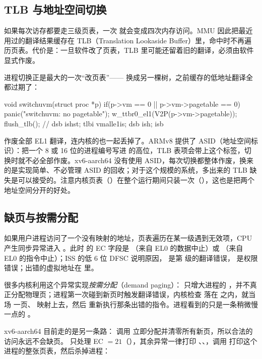 \subsection{TLB 与地址空间切换}

如果每次访存都要走三级页表，一次  就会变成四次内存访问。MMU 因此把最近用过的翻译结果缓存在 TLB（Translation Lookaside Buffer）里，命中时不再遍历页表。代价是：一旦软件改了页表，TLB 里可能还留着旧的翻译，必须由软件显式作废。

进程切换正是最大的一次“改页表”—— 换成另一棵树，之前缓存的低地址翻译全都过期了：

\begin{ccode}
void switchuvm(struct proc *p) {
  if(p->vm == 0 || p->vm->pagetable == 0) panic("switchuvm: no pagetable");
  w_ttbr0_el1(V2P(p->vm->pagetable));
  flush_tlb();                 // dsb ishst; tlbi vmalle1is; dsb ish; isb
}
\end{ccode}

 作废全部 EL1 翻译，连内核的也一起丢掉了。ARMv8 提供了 ASID（地址空间标识）：把一个 8 或 16 位的进程编号写进  的高位，TLB 表项会带上这个标签，切换时就不必全部作废。xv6-aarch64 没有使用 ASID，每次切换都整体作废，换来的是实现简单、不必管理 ASID 的回收；对于这个规模的系统，多出来的 TLB 缺失是可以接受的。注意内核页表（）在整个运行期间只装一次（），这也是把两个地址空间分开的好处。

\subsection{缺页与按需分配}

如果用户进程访问了一个没有映射的地址，页表遍历在某一级遇到无效项，CPU 产生同步异常进入 。此时  的 EC 字段是 （来自 EL0 的数据中止）或 （来自 EL0 的指令中止）；ISS 的低 6 位 DFSC 说明原因， 是第  级的翻译错误， 是权限错误；出错的虚拟地址在  里。

很多内核利用这个异常实现\emph{按需分配}（demand paging）： 只增大进程的 ，并不真正分配物理页；进程第一次碰到新页时触发翻译错误，内核检查  落在 \code{[0, sz)} 之内，就当场  一页、 映射上去，然后  重新执行那条出错的指令。进程看到的只是一条稍微慢一点的 。

xv6-aarch64 目前走的是另一条路： 调用  立即分配并清零所有新页，所以合法的访问永远不会缺页。 只处理 EC $=21$（），其余异常一律打印 、、，调用  打印这个进程的整张页表，然后杀掉进程：

